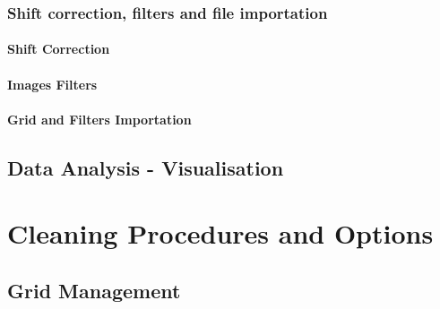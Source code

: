 \documentclass{article}
\begin{document}
    \newpage
    \subsubsection{Shift correction, filters and file importation}
    \label{subs:Shift Correction and Filters}

    \vspace{.3cm}
      \paragraph{Shift Correction\\\newline}
      \label{par:Shift Correction}
        

      \paragraph{Images Filters\\\newline}
      \label{par:Images Filters}
        

      \paragraph{Grid and Filters Importation\\\newline}
      \label{par:Grid and Filters Importation}
        

  \newpage
  \subsection{Data Analysis - Visualisation}
  \label{sub:Data Analysis - Visualisation}
  \vspace{.3cm}
    

\newpage
\section{Cleaning Procedures and Options}
\label{sec:Cleaning Procedures and Options}
\vspace{.5cm}

  \subsection{Grid Management}
  \label{sub:Grid Management}
    \vspace{.2cm}
    
\end{document}
